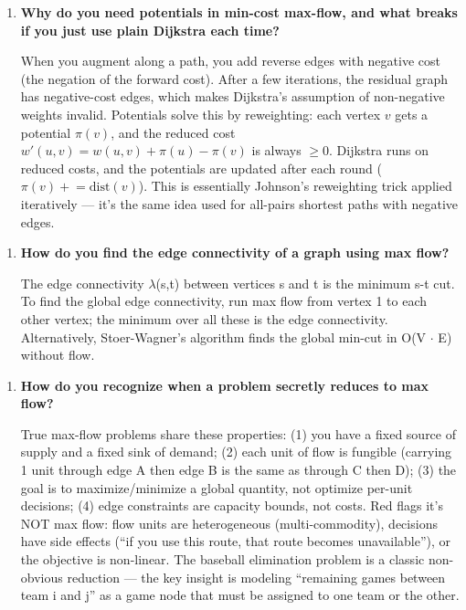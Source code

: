 \begin{enumerate}
\item \textbf{Why do you need potentials in min-cost max-flow, and what breaks if you just use plain Dijkstra each time?}\label{faq:mcmf-potentials}

When you augment along a path, you add reverse edges with negative cost (the negation of the forward cost). After a few iterations, the residual graph has negative-cost edges, which makes Dijkstra's assumption of non-negative weights invalid. Potentials solve this by reweighting: each vertex $v$ gets a potential $\pi(v)$, and the reduced cost $w'(u,v) = w(u,v) + \pi(u) - \pi(v)$ is always $\geq 0$. Dijkstra runs on reduced costs, and the potentials are updated after each round ($\pi(v) \mathrel{+}= \text{dist}(v)$). This is essentially Johnson's reweighting trick applied iteratively — it's the same idea used for all-pairs shortest paths with negative edges.
\end{enumerate}

\begin{enumerate}
\item \textbf{How do you find the edge connectivity of a graph using max flow?}

The edge connectivity $\lambda$(s,t) between vertices s and t is the minimum s-t cut. To find the global edge connectivity, run max flow from vertex 1 to each other vertex; the minimum over all these is the edge connectivity. Alternatively, Stoer-Wagner's algorithm finds the global min-cut in O(V $\cdot$ E) without flow.
\end{enumerate}

\begin{enumerate}
\item \textbf{How do you recognize when a problem secretly reduces to max flow?}\label{faq:max-flow-recognition}

True max-flow problems share these properties: (1) you have a fixed source of supply and a fixed sink of demand; (2) each unit of flow is fungible (carrying 1 unit through edge A then edge B is the same as through C then D); (3) the goal is to maximize/minimize a global quantity, not optimize per-unit decisions; (4) edge constraints are capacity bounds, not costs. Red flags it's NOT max flow: flow units are heterogeneous (multi-commodity), decisions have side effects (``if you use this route, that route becomes unavailable''), or the objective is non-linear. The baseball elimination problem is a classic non-obvious reduction — the key insight is modeling ``remaining games between team i and j'' as a game node that must be assigned to one team or the other.
\end{enumerate}

